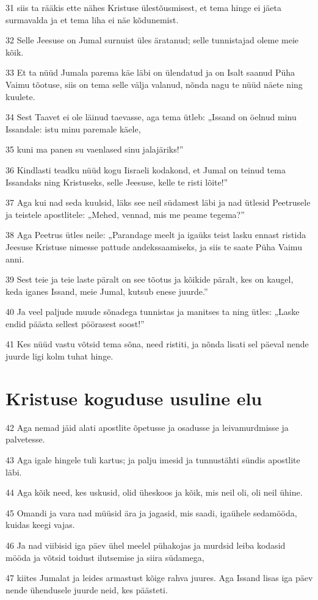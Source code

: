 \par 31 siis ta rääkis ette nähes Kristuse ülestõusmisest, et tema hinge ei jäeta surmavalda ja et tema liha ei näe kõdunemist.
\par 32 Selle Jeesuse on Jumal surnuist üles äratanud; selle tunnistajad oleme meie kõik.
\par 33 Et ta nüüd Jumala parema käe läbi on ülendatud ja on Isalt saanud Püha Vaimu tõotuse, siis on tema selle välja valanud, nõnda nagu te nüüd näete ning kuulete.
\par 34 Sest Taavet ei ole läinud taevasse, aga tema ütleb: „Issand on öelnud minu Issandale: istu minu paremale käele,
\par 35 kuni ma panen su vaenlased sinu jalajäriks!”
\par 36 Kindlasti teadku nüüd kogu Iisraeli kodakond, et Jumal on teinud tema Issandaks ning Kristuseks, selle Jeesuse, kelle te risti lõite!”
\par 37 Aga kui nad seda kuulsid, läks see neil südamest läbi ja nad ütlesid Peetrusele ja teistele apostlitele: „Mehed, vennad, mis me peame tegema?”
\par 38 Aga Peetrus ütles neile: „Parandage meelt ja igaüks teist lasku ennast ristida Jeesuse Kristuse nimesse pattude andekssaamiseks, ja siis te saate Püha Vaimu anni.
\par 39 Sest teie ja teie laste päralt on see tõotus ja kõikide päralt, kes on kaugel, keda iganes Issand, meie Jumal, kutsub enese juurde.”
\par 40 Ja veel paljude muude sõnadega tunnistas ja manitses ta ning ütles: „Laske endid päästa sellest pöörasest soost!”
\par 41 Kes nüüd vastu võtsid tema sõna, need ristiti, ja nõnda lisati sel päeval nende juurde ligi kolm tuhat hinge.

\section*{Kristuse koguduse usuline elu}

\par 42 Aga nemad jäid alati apostlite õpetusse ja osadusse ja leivamurdmisse ja palvetesse.
\par 43 Aga igale hingele tuli kartus; ja palju imesid ja tunnustähti sündis apostlite läbi.
\par 44 Aga kõik need, kes uskusid, olid üheskoos ja kõik, mis neil oli, oli neil ühine.
\par 45 Omandi ja vara nad müüsid ära ja jagasid, mis saadi, igaühele sedamööda, kuidas keegi vajas.
\par 46 Ja nad viibisid iga päev ühel meelel pühakojas ja murdsid leiba kodasid mööda ja võtsid toidust ilutsemise ja siira südamega,
\par 47 kiites Jumalat ja leides armastust kõige rahva juures. Aga Issand lisas iga päev nende ühendusele juurde neid, kes päästeti.


